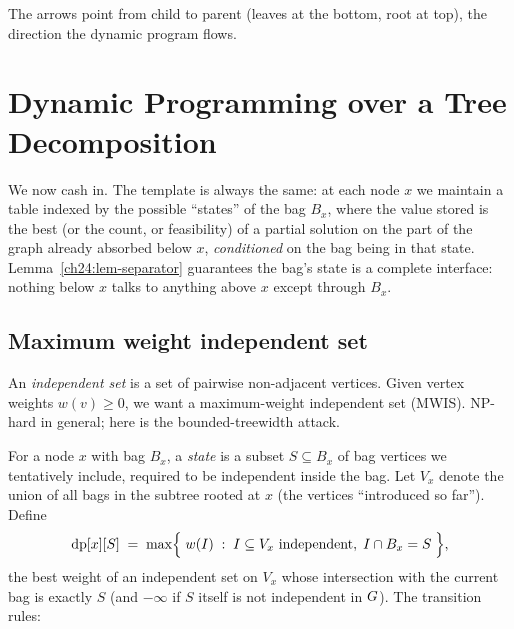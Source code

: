 \begin{center}
\end{center}

The arrows point from child to parent (leaves at the bottom, root at top), the
direction the dynamic program flows.

\section{Dynamic Programming over a Tree Decomposition}
\label{ch24:dp}

We now cash in. The template is always the same: at each node $x$ we maintain a
table indexed by the possible ``states'' of the bag $B_x$, where the value stored
is the best (or the count, or feasibility) of a partial solution on the part of
the graph already absorbed below $x$, \emph{conditioned} on the bag being in that
state. Lemma~\ref{ch24:lem-separator} guarantees the bag's state is a complete
interface: nothing below $x$ talks to anything above $x$ except through $B_x$.

\subsection{Maximum weight independent set}

An \emph{independent set} is a set of pairwise non-adjacent vertices. Given vertex
weights $w(v)\ge 0$, we want a maximum-weight independent set (MWIS). NP-hard in
general; here is the bounded-treewidth attack.

For a node $x$ with bag $B_x$, a \emph{state} is a subset $S\subseteq B_x$ of bag
vertices we tentatively include, required to be independent inside the bag. Let
$V_x$ denote the union of all bags in the subtree rooted at $x$ (the vertices
``introduced so far''). Define
\[
  \mathrm{dp}[x][S] \;=\;
  \max\Bigl\{\; w(I) \;:\; I\subseteq V_x \text{ independent},\;
  I\cap B_x = S \;\Bigr\},
\]
the best weight of an independent set on $V_x$ whose intersection with the current
bag is exactly $S$ (and $-\infty$ if $S$ itself is not independent in $G$). The
transition rules:

